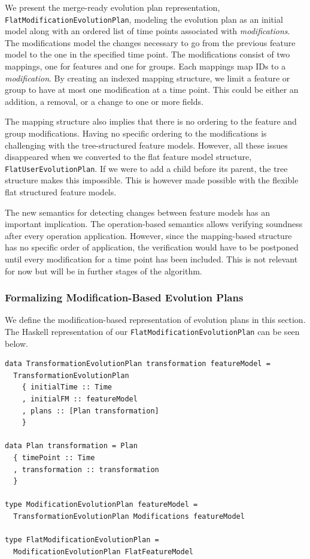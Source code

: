 \documentclass[a4paper,english]{ifimaster}
\begin{document}
We present the merge-ready evolution plan representation, \texttt{Flat\-Modification\-Evolution\-Plan}, modeling the evolution plan as an initial model along with an ordered list of time points associated with \textit{modifications}. The modifications model the changes necessary to go from the previous feature model to the one in the specified time point. The modifications consist of two mappings, one for features and one for groups. Each mappings map IDs to a \textit{modification}. By creating an indexed mapping structure, we limit a feature or group to have at most one modification at a time point. This could be either an addition, a removal, or a change to one or more fields. 

The mapping structure also implies that there is no ordering to the feature and group modifications. Having no specific ordering to the modifications is challenging with the tree-structured feature models. However, all these issues disappeared when we converted to the flat feature model structure, \texttt{Flat\-User\-Evolution\-Plan}. If we were to add a child before its parent, the tree structure makes this impossible. This is however made possible with the flexible flat structured feature models.

The new semantics for detecting changes between feature models has an important implication. The operation-based semantics allows verifying soundness after every operation application. However, since the mapping-based structure has no specific order of application, the verification would have to be postponed until every modification for a time point has been included. This is not relevant for now but will be in further stages of the algorithm.

\subsubsection{Formalizing Modification-Based Evolution Plans}%
\label{ssub:formalizing_modification_based_evolution_plans}

We define the modification-based representation of evolution plans in this section. The Haskell representation of our \texttt{Flat\-Modification\-Evolution\-Plan} can be seen below.

\begin{verbatim}
data TransformationEvolutionPlan transformation featureModel = 
  TransformationEvolutionPlan
    { initialTime :: Time
    , initialFM :: featureModel
    , plans :: [Plan transformation]
    }

data Plan transformation = Plan
  { timePoint :: Time
  , transformation :: transformation
  }

type ModificationEvolutionPlan featureModel = 
  TransformationEvolutionPlan Modifications featureModel

type FlatModificationEvolutionPlan = 
  ModificationEvolutionPlan FlatFeatureModel
\end{verbatim}
\end{document}
